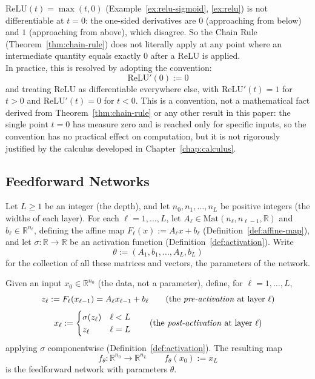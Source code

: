 		\begin{remark}
			\label{rem:relu-nondifferentiable}
			$\mathrm{ReLU}(t)=\max(t,0)$ (Example~\ref{ex:relu-sigmoid}, \ref{ex:relu}) is not differentiable at $t=0$: the one-sided derivatives are $0$ (approaching from below) and $1$ (approaching from above), which disagree. So the Chain Rule (Theorem~\ref{thm:chain-rule}) does not literally apply at any point where an intermediate quantity equals exactly $0$ after a ReLU is applied. \\
			
			In practice, this is resolved by adopting the convention:
			\[
				\mathrm{ReLU}'(0) := 0
			\]
			and treating $\mathrm{ReLU}$ as differentiable everywhere else, with $\mathrm{ReLU}'(t)=1$ for $t>0$ and $\mathrm{ReLU}'(t)=0$ for $t<0$. This is a convention, not a mathematical fact derived from Theorem~\ref{thm:chain-rule} or any other result in this paper: the single point $t=0$ has measure zero and is reached only for specific inputs, so the convention has no practical effect on computation, but it is not rigorously justified by the calculus developed in Chapter~\ref{chap:calculus}.
		\end{remark}
		
	\subsection{Feedforward Networks}
		
		\begin{definition}
			\label{def:feedforward-network}
			Let $L\ge1$ be an integer (the depth), and let $n_0,n_1,\dots,n_L$ be positive integers (the widths of each layer). For each $\ell=1,\dots,L$, let $A_\ell\in\mathrm{Mat}(n_\ell,n_{\ell-1},\mathbb{R})$ and $b_\ell\in\mathbb{R}^{n_\ell}$, defining the affine map $F_\ell(x):=A_\ell x+b_\ell$ (Definition~\ref{def:affine-map}), and let $\sigma:\mathbb{R}\to\mathbb{R}$ be an activation function (Definition~\ref{def:activation}). Write
			\[
				\theta := (A_1,b_1,\dots,A_L,b_L)
			\]
			for the collection of all these matrices and vectors, the parameters of the network.
			
			Given an input $x_0\in\mathbb{R}^{n_0}$ (the data, not a parameter), define, for $\ell=1,\dots,L$,
			\[
				z_\ell := F_\ell(x_{\ell-1}) = A_\ell x_{\ell-1}+b_\ell \qquad \text{(the \emph{pre-activation} at layer $\ell$)}
			\]
			\[
				x_\ell := \begin{cases} \sigma(z_\ell) & \ell < L \\ z_\ell & \ell = L \end{cases} \qquad \text{(the \emph{post-activation} at layer $\ell$)}
			\]
			applying $\sigma$ componentwise (Definition~\ref{def:activation}). The resulting map
			\[
				f_\theta : \mathbb{R}^{n_0}\to\mathbb{R}^{n_L} \qquad f_\theta(x_0) := x_L
			\]
			is the feedforward network with parameters $\theta$.
		\end{definition}
		
